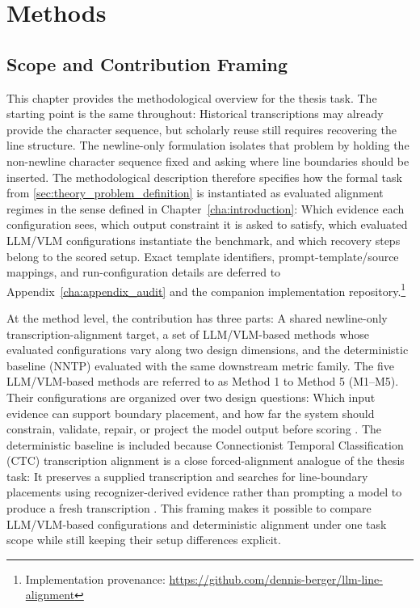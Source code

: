 
\chapter{Methods}
\label{cha:method}

\section{Scope and Contribution Framing}
\label{sec:method_scope}

This chapter provides the methodological overview for the thesis task. The starting point is the same throughout: Historical transcriptions may already provide the character sequence, but scholarly reuse still requires recovering the line structure. The newline-only formulation isolates that problem by holding the non-newline character sequence fixed and asking where line boundaries should be inserted. The methodological description therefore specifies how the formal task from \autoref{sec:theory_problem_definition} is instantiated as evaluated alignment regimes in the sense defined in Chapter~\ref{cha:introduction}: Which evidence each configuration sees, which output constraint it is asked to satisfy, which evaluated LLM/VLM configurations instantiate the benchmark, and which recovery steps belong to the scored setup. Exact template identifiers, prompt-template/source mappings, and run-configuration details are deferred to Appendix~\ref{cha:appendix_audit} and the companion implementation repository.\footnote{Implementation provenance: \url{https://github.com/dennis-berger/llm-line-alignment}}

At the method level, the contribution has three parts: A shared newline-only transcription-alignment target, a set of LLM/VLM-based methods whose evaluated configurations vary along two design dimensions, and the deterministic baseline (NNTP) evaluated with the same downstream metric family. The five LLM/VLM-based methods are referred to as Method 1 to Method 5 (M1--M5). Their configurations are organized over two design questions: Which input evidence can support boundary placement, and how far the system should constrain, validate, repair, or project the model output before scoring . The deterministic baseline is included because Connectionist Temporal Classification (CTC) transcription alignment is a close forced-alignment analogue of the thesis task: It preserves a supplied transcription and searches for line-boundary placements using recognizer-derived evidence rather than prompting a model to produce a fresh transcription . This framing makes it possible to compare LLM/VLM-based configurations and deterministic alignment under one task scope while still keeping their setup differences explicit.

